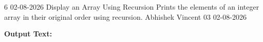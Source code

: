 \clearpage
\label{prog:06}
\programhead
  {6}
  {02-08-2026}
  {Display an Array Using Recursion}
  {Prints the elements of an integer array in their original order using recursion.}
  {Abhishek Vincent}
  {03}
  {02-08-2026}

\divider
\textbf{Output Text:}\par
\vspace{2pt}

